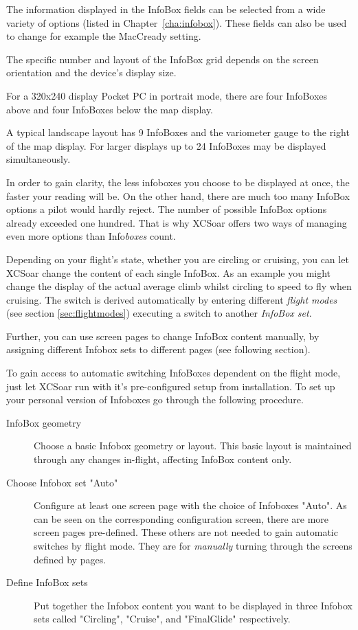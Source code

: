 The information displayed in the InfoBox fields can be selected from a
wide variety of options (listed in Chapter~\ref{cha:infobox}). These
fields can also be used to change for example the MacCready setting.

The specific number and layout of the InfoBox grid depends on the
screen orientation and the device's display size.  

For a 320x240 display
Pocket PC in portrait mode, there are four InfoBoxes above and four
InfoBoxes below the map display.  

A typical landscape layout has 9 InfoBoxes and the variometer gauge 
to the right of the map display. 
For larger displays up to 24 InfoBoxes may be displayed simultaneously.  

In order to gain clarity, the less infoboxes you choose to be displayed at once, 
the faster your reading will be. On the other hand, there are much too many 
InfoBox options a pilot would hardly reject. The number of possible InfoBox 
options already exceeded one hundred. That is why XCSoar offers two ways of 
managing even more options than Info\emph{boxes} count.

Depending on your flight's state, whether you are circling or cruising, you can 
let XCSoar change the content of each single InfoBox. As an example you might 
change the display of the actual average climb whilst circling to speed to fly 
when cruising. The switch is derived automatically by entering different 
\emph{flight modes} (see section \ref{sec:flightmodes}) executing a switch to 
another \emph{InfoBox set}.

Further, you can use screen pages to change InfoBox content manually, by 
assigning different Infobox sets to different pages (see following section).

To gain access to automatic switching InfoBoxes dependent on the flight mode, 
just let XCSoar run with it's pre-configured setup from installation. To set up 
your personal version of Infoboxes go through the following procedure.
\begin{description}
\item[InfoBox geometry] Choose a basic Infobox geometry or layout.  This basic 
layout is maintained through any changes in-flight, affecting InfoBox content 
only.
\item[Choose Infobox set "Auto"] Configure at least one screen page with the 
choice of Infoboxes "Auto". As can be seen on the corresponding configuration 
screen, there are more screen pages pre-defined.   These 
others are not needed to gain automatic switches by flight mode. They are for \emph{manually} turning through the screens defined by pages. 
\item[Define InfoBox sets] Put together the Infobox content you want to be 
displayed in three Infobox sets called "Circling", "Cruise", and "FinalGlide" 
respectively.
\end{description}  


